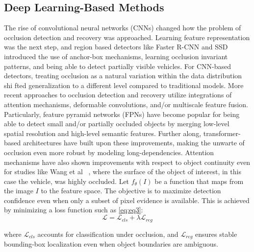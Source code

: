 \documentclass[12pt,a4paper]{report}
\theoremstyle{definition}
\theoremstyle{remark}
\begin{document}
\subsection{Deep Learning-Based Methods}
 The rise of convolutional neural networks (CNNs) changed how the problem of occlusion detection and recovery was approached. Learning feature representation was the next step, and region based detectors like Faster R-CNN and SSD introduced the use of anchor-box mechanisms, learning occlusion invariant patterns, and being able to detect partially visible vehicles. For CNN-based detectors, treating occlusion as a natural variation within the data distribution shi fted generalization to a different level compared to traditional models. More recent approaches to occlusion detection and recovery utilize integrations of attention mechanisms, deformable convolutions, and/or multiscale feature fusion. Particularly, feature pyramid networks (FPNs) have become popular for being able to detect small and/or partially occluded objects by merging low-level spatial resolution and high-level semantic features. Further along, transformer-based architectures have built upon these improvements, making the unwarte of occlusion even more robust by modeling long-dependencies. Attention mechanisms have also shown improvements with respect to object continuity even for studies like Wang et al ~\cite{paper26}, where the surface of the object of interest, in this case the vehicle, was highly occluded. Let $f_\theta(I)$ be a function that maps from the image $I$ to the feature space. The objective is to maximize detection confidence even when only a subset of pixel evidence is available. This is achieved by minimizing a loss function such as \ref{eq:eq3}:
\begin{equation}
\label{eq:eq3}
    \mathcal{L} = \mathcal{L}_{cls} + \lambda \mathcal{L}_{reg}
\end{equation}

where $\mathcal{L}_{cls}$ accounts for classification under occlusion, and $\mathcal{L}_{reg}$ ensures stable bounding-box localization even when object boundaries are ambiguous.
\end{document}
